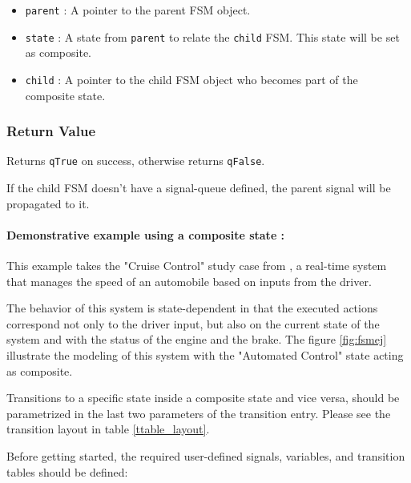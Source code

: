 \begin{itemize}
    \item \lstinline{parent} : A pointer to the parent FSM object.
    \item \lstinline{state} : A state from \lstinline{parent} to relate the \lstinline{child} FSM. This state will be set as composite.
    \item \lstinline{child} : A pointer to the child FSM object who becomes part of the composite state.
\end{itemize}

\subsubsection*{Return Value}
Returns \lstinline{qTrue} on success, otherwise returns \lstinline{qFalse}.

\hrulefill
\medskip

\begin{tcolorbox}
\HandRight If the child FSM doesn't have a signal-queue defined, the parent signal will be propagated to it.
\end{tcolorbox}


\paragraph{Demonstrative example using a composite state :} This example takes the "Cruise Control" study case from \cite{gomaa}, a real-time system that manages the speed of an automobile based on inputs from the driver. 



The behavior of this system is state-dependent in that the executed actions correspond not only to the driver input, but also on the current state of the system and with the status of the engine and the brake. 
The figure \ref{fig:fsmej} illustrate the modeling of this system with the "Automated Control" state acting as composite.
\medskip

\begin{tcolorbox}
\HandRight Transitions to a specific state inside a composite state and vice versa, should be parametrized in the last two parameters of the transition entry. Please see the transition layout in table \ref{ttable_layout}.
\end{tcolorbox}



Before getting started, the required user-defined signals, variables, and transition tables should be defined:

